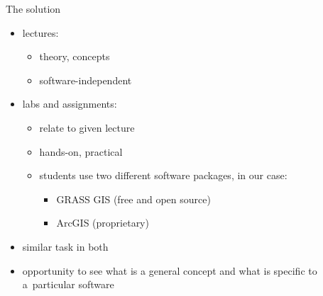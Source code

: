 \documentclass[xcolor={dvipsnames,usenames},beamer]{beamer}
\begin{document}
\begin{frame}{The solution}

\begin{itemize}
 \item lectures:
 \begin{itemize}
  \item theory, concepts
  \item software-independent
 \end{itemize}
 \item labs and assignments:
 \begin{itemize}
  \item relate to given lecture
  \item hands-on, practical
  \item \alert<1>{students use two different software packages}\pause, in our case:
  \begin{itemize}
   \item GRASS GIS (free and open source)
   \item ArcGIS (proprietary)
  \end{itemize}
 \end{itemize}
  \pause
  \item similar task in both
  \item opportunity to see what is a general concept
        and what is specific to a~particular software
\end{itemize}

\end{frame}
\end{document}
